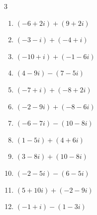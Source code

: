 \begin{multicols}{3}
\begin{enumerate}
        \phantom{$\displaystyle =3-4i$}

  \item $\displaystyle (-6+2i) + (9+2i)$

        \phantom{$\displaystyle =3+4i$}

  \item $\displaystyle (-3-i) + (-4+i)$

        \phantom{$\displaystyle =-7$}

  \item $\displaystyle (-10+i) + (-1-6i)$

        \phantom{$\displaystyle =-11-5i$}

  \item $\displaystyle (4-9i) - (7-5i)$

        \phantom{$\displaystyle =-3-4i$}

  \item $\displaystyle (-7+i) + (-8+2i)$

        \phantom{$\displaystyle =-15+3i$}

  \item $\displaystyle (-2-9i) + (-8-6i)$

        \phantom{$\displaystyle =-10-15i$}

  \item $\displaystyle (-6-7i) - (10-8i)$

        \phantom{$\displaystyle =-16+i$}

  \item $\displaystyle (1-5i) + (4+6i)$

        \phantom{$\displaystyle =5+i$}

  \item $\displaystyle (3-8i) + (10-8i)$

        \phantom{$\displaystyle =13-16i$}

  \item $\displaystyle (-2-5i) - (6-5i)$

        \phantom{$\displaystyle =-8$}

  \item $\displaystyle (5+10i) + (-2-9i)$

        \phantom{$\displaystyle =3+i$}

\columnbreak %

\resetques

  \item $\displaystyle (-1+i) - (1-3i)$

        \phantom{$\displaystyle =-2+4i$}


\end{enumerate}
\end{multicols}
